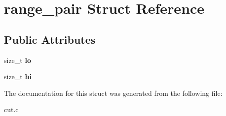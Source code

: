 \hypertarget{structrange__pair}{
\section{range\_\-pair Struct Reference}
\label{structrange__pair}
}
\subsection*{Public Attributes}
\begin{DoxyCompactItemize}
\item 
\hypertarget{structrange__pair_ad3ef72c74a8ac4a6c77af0403f970dbf}{
size\_\-t {\bfseries lo}}
\label{structrange__pair_ad3ef72c74a8ac4a6c77af0403f970dbf}

\item 
\hypertarget{structrange__pair_aaea8c7ed599031ad6a7c84ad6af54a0a}{
size\_\-t {\bfseries hi}}
\label{structrange__pair_aaea8c7ed599031ad6a7c84ad6af54a0a}

\end{DoxyCompactItemize}


The documentation for this struct was generated from the following file:\begin{DoxyCompactItemize}
\item 
cut.c\end{DoxyCompactItemize}
